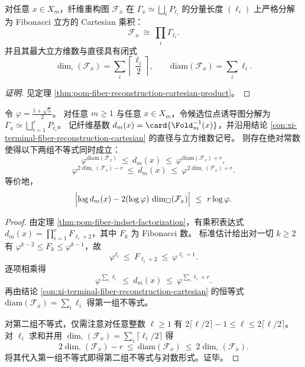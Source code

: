 \begin{conclusion}\label{con:xi-terminal-fiber-reconstruction-cartesian}
对任意 \(x\in X_m\)，纤维重构图 \(\mathcal F_x\) 在 \(\Gamma_x\simeq\bigsqcup_i P_{\ell_i}\) 的分量长度 \((\ell_i)\) 上严格分解为 Fibonacci 立方的 Cartesian 乘积：
\[
\mathcal F_x\ \cong\ \prod_i \Gamma_{\ell_i}.
\]
并且其最大立方维数与直径具有闭式
\[
\dim_{\square}(\mathcal F_x)=\sum_i \left\lceil\frac{\ell_i}{2}\right\rceil,
\qquad
\mathrm{diam}(\mathcal F_x)=\sum_i \ell_i .
\]
\end{conclusion}
\begin{proof}[证明]
见定理 \ref{thm:pom-fiber-reconstruction-cartesian-product}。
\end{proof}
\begin{theorem}\label{thm:xi-fold-fiber-fibonacci-phi-exponential-law}
令 \(\varphi=\frac{1+\sqrt5}{2}\)。
对任意 \(m\ge 1\) 与任意 \(x\in X_m\)，令候选位点诱导图分解为
\(
\Gamma_x\simeq\bigsqcup_{i=1}^{r}P_{\ell_i}
\)。
记纤维基数 \(d_m(x)=\card{\Fold_m^{-1}(x)}\)，并沿用结论 \ref{con:xi-terminal-fiber-reconstruction-cartesian} 的直径与立方维数记号。
则存在绝对常数使得以下两组不等式同时成立：
\[
\varphi^{\mathrm{diam}(\mathcal F_x)}\ \le\ d_m(x)\ \le\ \varphi^{\mathrm{diam}(\mathcal F_x)+r},
\]
\[
\varphi^{2\dim_{\square}(\mathcal F_x)-r}\ \le\ d_m(x)\ \le\ \varphi^{2\dim_{\square}(\mathcal F_x)+r}.
\]
等价地，
\[
\Bigl|\log d_m(x)-2(\log\varphi)\,\dim_{\square}(\mathcal F_x)\Bigr|\ \le\ r\log\varphi.
\]
\end{theorem}
\begin{proof}
由定理 \ref{thm:pom-fiber-indset-factorization}，有乘积表达式
\(
d_m(x)=\prod_{i=1}^{r}F_{\ell_i+2}
\)，其中 \(F_k\) 为 Fibonacci 数。
标准估计给出对一切 \(k\ge 2\) 有 \(\varphi^{k-2}\le F_k\le \varphi^{k-1}\)，故
\[
\varphi^{\ell_i}\ \le\ F_{\ell_i+2}\ \le\ \varphi^{\ell_i+1}.
\]
逐项相乘得
\[
\varphi^{\sum_i \ell_i}\ \le\ d_m(x)\ \le\ \varphi^{\sum_i \ell_i+r}.
\]
再由结论 \ref{con:xi-terminal-fiber-reconstruction-cartesian} 的恒等式 \(\mathrm{diam}(\mathcal F_x)=\sum_i\ell_i\) 得第一组不等式。
\par
对第二组不等式，仅需注意对任意整数 \(\ell\ge 1\) 有
\(
2\lceil \ell/2\rceil-1\le \ell\le 2\lceil \ell/2\rceil
\)。
对 \(\ell_i\) 求和并用 \(\dim_{\square}(\mathcal F_x)=\sum_i\lceil \ell_i/2\rceil\) 得
\[
2\dim_{\square}(\mathcal F_x)-r\ \le\ \mathrm{diam}(\mathcal F_x)\ \le\ 2\dim_{\square}(\mathcal F_x).
\]
将其代入第一组不等式即得第二组不等式与对数形式。证毕。
\end{proof}
